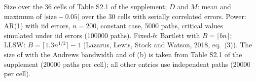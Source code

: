 Size over the 36 cells of Table S2.1 of the supplement; $D$ and $M$: mean and maximum of $|\text{size} - 0.05|$ over the 30 cells with serially correlated errors. Power: AR(1) with iid errors, $n = 200$, constant case, 5000 paths, critical values simulated under iid errors (100000 paths). Fixed-$b$: Bartlett with $B = \lceil b n\rceil$; LLSW: $B = \lceil 1.3 n^{1/2}\rceil - 1$ (Lazarus, Lewis, Stock and Watson, 2018, eq.~(3)). The size of \RMGLS{} with the Andrews bandwidth and of (b) is taken from Table S2.1 of the supplement ($20000$ paths per cell); all other entries use independent paths ($20000$ per cell).
